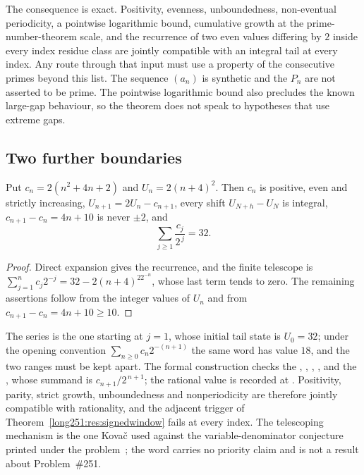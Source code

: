 \documentclass[11pt]{article}
\begin{document}
The consequence is exact.  Positivity, evenness, unboundedness, non-eventual
periodicity, a pointwise logarithmic bound, cumulative growth at the
prime-number-theorem scale, and the recurrence of two even values differing by
$2$ inside every index residue class are jointly compatible with an integral
tail at every index.  Any route through that input must use a property of the
consecutive primes beyond this list.  The sequence $(a_n)$ is synthetic and the
$P_n$ are not asserted to be prime.  The pointwise logarithmic bound also
precludes the known large-gap behaviour, so the theorem does not speak to
hypotheses that use extreme gaps.

\subsection{Two further boundaries}

\begin{proposition}\label{long251:res:polynomialcountermodel}
Put $c_n=2(n^2+4n+2)$ and $U_n=2(n+4)^2$.  Then $c_n$ is positive, even and
strictly increasing, $U_{n+1}=2U_n-c_{n+1}$, every shift $U_{N+h}-U_N$ is
integral, $c_{n+1}-c_n=4n+10$ is never $\pm2$, and
\[
 \sum_{j\ge1}\frac{c_j}{2^{\,j}}=32 .
\]
\end{proposition}

\begin{proof}
Direct expansion gives the recurrence, and the finite telescope is
$\sum_{j=1}^{n}c_j2^{-j}=32-2(n+4)^22^{-n}$, whose last term tends to zero.
The remaining assertions follow from the integer values of $U_n$ and from
$c_{n+1}-c_n=4n+10\ge10$.
\end{proof}

\noindent The series is the one starting at $j=1$, whose initial tail state is
$U_0=32$; under the opening convention $\sum_{n\ge0}c_n2^{-(n+1)}$ the same
word has value $18$, and the two ranges must be kept apart.  The formal
construction checks the
,
,
,
, and the
, whose summand is $c_{n+1}/2^{\,n+1}$; the
rational value is recorded at
.
Positivity, parity, strict growth, unboundedness and nonperiodicity are
therefore jointly compatible with rationality, and the adjacent trigger of
Theorem~\ref{long251:res:signedwindow} fails at every index.  The telescoping mechanism
is the one Kova\v{c} used against the variable-denominator conjecture printed
under the problem~\cite[Theorem~1 and proof, pp.~1--2]{kovac2026}; the word
carries no priority claim and is not a result about Problem~\#251.
\end{document}
